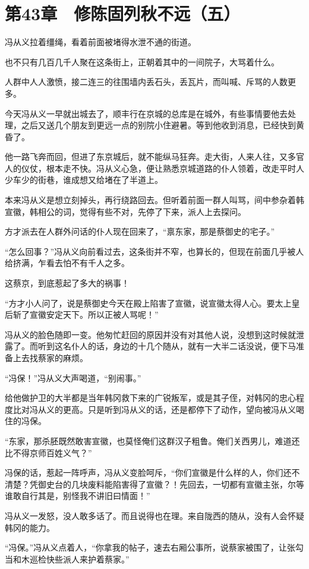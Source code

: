 \section{第43章　修陈固列秋不远（五）}

冯从义拉着缰绳，看着前面被堵得水泄不通的街道。

也不只有几百几千人聚在这条街上，正朝着其中的一间院子，大骂着什么。

人群中人人激愤，接二连三的往围墙内丢石头，丢瓦片，而叫喊、斥骂的人数更多。

今天冯从义一早就出城去了，顺丰行在京城的总库是在城外，有些事情要他去处理，之后又送几个朋友到更远一点的别院小住避暑。等到他收到消息，已经快到黄昏了。

他一路飞奔而回，但进了东京城后，就不能纵马狂奔。走大街，人来人往，又多官人的仪仗，根本走不快。冯从义心急，便让熟悉京城道路的仆人领着，改走平时人少车少的街巷，谁成想又给堵在了半道上。

本来冯从义是想立刻掉头，再行绕路回去。但听着前面一群人叫骂，间中参杂着韩宣徽，韩相公的词，觉得有些不对，先停了下来，派人上去探问。

方才派去在人群外问话的仆人现在回来了，“禀东家，那是蔡御史的宅子。”

“怎么回事？”冯从义向前看过去，这条街并不窄，也算长的，但现在前面几乎被人给挤满，乍看去怕不有千人之多。

这蔡京，到底惹起了多大的祸事！

“方才小人问了，说是蔡御史今天在殿上陷害了宣徽，说宣徽太得人心。要太上皇后斩了宣徽安定天下。所以正被人骂呢！”

冯从义的脸色随即一变。他匆忙赶回的原因并没有对其他人说，没想到这时候就泄露了。而听到这名仆人的话，身边的十几个随从，就有一大半二话没说，便下马准备上去找蔡家的麻烦。

“冯保！”冯从义大声喝道，“别闹事。”

给他做护卫的大半都是当年韩冈救下来的广锐叛军，或是其子侄，对韩冈的忠心程度比对冯从义的更高。只是听到冯从义的话，还是都停下了动作，望向被冯从义喝住的冯保。

“东家，那杀胚既然敢害宣徽，也莫怪俺们这群汉子粗鲁。俺们关西男儿，难道还比不得京师百姓义气？”

冯保的话，惹起一阵呼声，冯从义变脸呵斥，“你们宣徽是什么样的人，你们还不清楚？凭御史台的几块废料能陷害得了宣徽？！先回去，一切都有宣徽主张，尔等谁敢自行其是，别怪我不讲旧曰情面！”

冯从义一发怒，没人敢多话了。而且说得也在理。来自陇西的随从，没有人会怀疑韩冈的能力。

“冯保。”冯从义点着人，“你拿我的帖子，速去右厢公事所，说蔡家被围了，让张勾当和木巡检快些派人来护着蔡家。”

